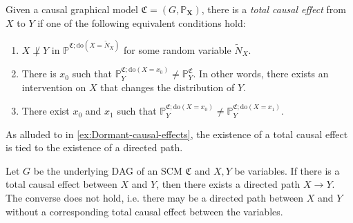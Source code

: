\documentclass[../main.tex]{subfiles}
\begin{document}
     \begin{defn}
     \label{defn:Total-causal-effect}
        Given a causal graphical model ${\mathfrak{C} = (G, \mathbb{P}_\mathbf{X})}$, there is a \emph{total causal effect} from ${X}$ to ${Y}$ if one of the following equivalent conditions hold:
        \begin{enumerate}
            \item ${X\not\perp Y}$ in ${\mathbb{P}^{\mathfrak{C};\text{do}(X=\tilde{N}_X)}}$ for some random variable ${\tilde{N}_X}$.
            \item There is ${x_0}$ such that ${\mathbb{P}^{\mathfrak{C};\text{do}(X=x_0)}_Y\neq \mathbb{P}_Y^\mathfrak{C}}$. In other words, there exists an intervention on ${X}$ that changes the distribution of ${Y}$.
            \item There exist ${x_0}$ and ${x_1}$ such that ${\mathbb{P}^{\mathfrak{C};\text{do}(X=x_0)}_Y\neq \mathbb{P}^{\mathfrak{C};\text{do}(X=x_1)}_Y }$. 
        \end{enumerate}
     \end{defn}
     As alluded to in \autoref{ex:Dormant-causal-effects}, the existence of a total causal effect is tied to the existence of a directed path. 
     \begin{pro}
     \label{pro:ro:Directed-paths-and-total-causal-effect}
        Let ${G}$ be the underlying DAG of an SCM ${\mathfrak{C}}$ and ${X,Y}$ be variables. If there is a total causal effect between ${X}$ and ${Y}$, then there exists a directed path ${X\to Y}$. The converse does not hold, i.e. there may be a directed path between ${X}$ and ${Y}$ without a corresponding total causal effect between the variables.
     \end{pro}
\end{document}
